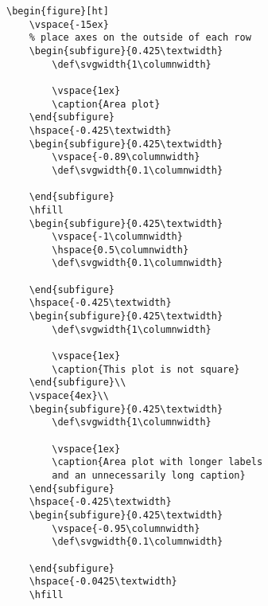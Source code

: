 \documentclass{article}
\begin{document}
\begin{verbatim}
\begin{figure}[ht]
    \vspace{-15ex}
    % place axes on the outside of each row
    \begin{subfigure}{0.425\textwidth}
        \def\svgwidth{1\columnwidth}
        
        \vspace{1ex}
        \caption{Area plot}
    \end{subfigure}
    \hspace{-0.425\textwidth}
    \begin{subfigure}{0.425\textwidth}
        \vspace{-0.89\columnwidth}
        \def\svgwidth{0.1\columnwidth}
        
    \end{subfigure}
    \hfill
    \begin{subfigure}{0.425\textwidth}
        \vspace{-1\columnwidth}
        \hspace{0.5\columnwidth}
        \def\svgwidth{0.1\columnwidth}
        
    \end{subfigure}
    \hspace{-0.425\textwidth}
    \begin{subfigure}{0.425\textwidth}
        \def\svgwidth{1\columnwidth}
        
        \vspace{1ex}
        \caption{This plot is not square}
    \end{subfigure}\\
    \vspace{4ex}\\
    \begin{subfigure}{0.425\textwidth}
        \def\svgwidth{1\columnwidth}
        
        \vspace{1ex}
        \caption{Area plot with longer labels
        and an unnecessarily long caption}
    \end{subfigure}
    \hspace{-0.425\textwidth}
    \begin{subfigure}{0.425\textwidth}
        \vspace{-0.95\columnwidth}
        \def\svgwidth{0.1\columnwidth}
        
    \end{subfigure}
    \hspace{-0.0425\textwidth}
    \hfill

\end{verbatim}
\end{document}
